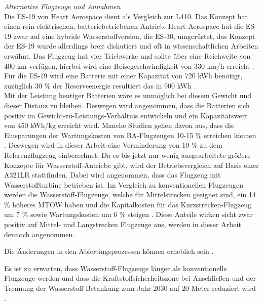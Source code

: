 \textit{Alternative Flugzeuge und Annahmen}\\
Die ES-19 von Heart Aerospace dient als Vergleich zur L410. 
Das Konzept hat einen rein elektrischen, batteriebetriebenen Antrieb.
Heart Aerospace hat die ES-19 zwar auf eine hybride Wasserstoffversion, die ES-30, umgerüstet, 
das Konzept der ES-19 wurde allerdings breit diskutiert und oft in wissenschaftlichen Arbeiten erwähnt. 
Das Flugzeug hat vier Triebwerke und sollte über eine Reichweite von 400 km verfügen, 
hierbei wird eine Reisegeschwindigkeit von 330 km/h erreicht  \cite{anker2023feasibility} \cite{heart_aerospace_es19}.
Für die ES-19 wird eine Batterie mit einer Kapazität von 720 kWh benötigt,
zuzüglich 30 \% der Reserveenergie resultiert das in 900 kWh \cite{donckers2024electric}. \\
Mit der Leistung heutiger Batterien wäre es unmöglich bei diesem Gewicht und dieser Distanz zu bleiben.
Deswegen wird angenommen, dass die Batterien sich positiv im Gewicht-zu-Leistungs-Verhältnis 
entwickeln und ein Kapazitätswert von 450 kWh/kg erreicht wird.
Manche Studien gehen davon aus, dass die Einsparungen der Wartungskosten 
von BA-Flugzeugen 10-15 \% erreichen können \cite{wangsness2021fremskyndet,avogadro2024demystifying}. 
Deswegen wird in dieser Arbeit eine Verminderung von 10 \% zu dem Referenzflugzeug einberechnet.
%
Da es bis jetzt nur wenig ausgearbeitete größere Konzepte für Wasserstoff-Antriebe gibt, 
wird der Betriebsvergleich auf Basis einer A321LR stattfinden. 
Dabei wird angenommen, dass das Flugzeug mit Wasserstoffturbine betrieben ist.
Im Vergleich zu konventionellen Flugzeugen werden die Wasserstoff-Flugzeuge, 
welche für Mittelstrecken geeignet sind, ein 14 \% höheres MTOW haben und die Kapitalkosten 
für das Kurzstrecken-Flugzeug um 7 \% sowie Wartungskosten um 6 \% steigen \cite{sky2020hydrogen}. 
Diese Anteile wirken sicht zwar positiv auf Mittel- und Langstrecken Flugzeuge aus, 
werden in dieser Arbeit dennoch angenommen.

Die Änderungen in den Abfertingsprozessen können erheblich sein \cite{ati_hydrogen_infrastructure}. 

Es ist zu erwarten, dass Wasserstoff-Flugzeuge länger als konventionelle Flugzeuge werden
und dass die Kraftstoffsicherheitszone bei Anschließen und der Trennung 
der Wasserstoff-Betankung zum Jahr 2030 auf 20 Meter reduziert wird \cite{hoelzen2022h2}.

